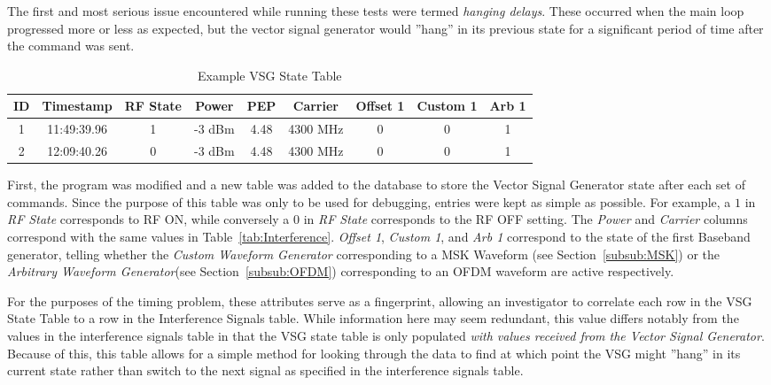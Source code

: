 The first and most serious issue encountered while running these tests were termed \textit{hanging delays}. These occurred when the main loop progressed more or less as expected, but the vector signal generator would ''hang'' in its previous state for a significant period of time after the command was sent. 



\begin{table}[]
\centering
\begin{tabular}{@{}ccccccccc@{}}
\toprule
ID & Timestamp   & RF State & Power  & PEP  & Carrier  & Offset 1 & Custom 1 & Arb 1 \\ \midrule
1  & 11:49:39.96 & 1        & -3 dBm & 4.48 & 4300 MHz & 0        & 0        & 1     \\
2  & 12:09:40.26 & 0        & -3 dBm & 4.48 & 4300 MHz & 0        & 0        & 1     \\ \bottomrule


\end{tabular}
\caption{Example VSG State Table}
\label{tab:VSG_State}
\end{table}
 
	 First, the program was modified and a new table was added to the database to store the Vector Signal Generator state after each set of commands. Since the purpose of this table was only to be used for debugging, entries were kept as simple as possible. For example, a $1$ in \textit{RF State} corresponds to RF ON, while conversely a $0$ in \textit{RF State} corresponds to the RF OFF setting. The \textit{Power} and \textit{Carrier} columns correspond with the same values in Table~\ref{tab:Interference}. \textit{Offset 1}, \textit{Custom 1}, and \textit{Arb 1} correspond to the state of the first Baseband generator, telling whether the \textit{Custom Waveform Generator} corresponding to a MSK Waveform (see Section~\ref{subsub:MSK}) or the \textit{Arbitrary Waveform Generator}(see Section~\ref{subsub:OFDM}) corresponding to an OFDM waveform are active respectively. 
	 
For the purposes of the timing problem, these attributes serve as a fingerprint, allowing an investigator to correlate each row in the VSG State Table to a row in the Interference Signals table. While information here may seem redundant, this value differs notably from the values in the interference signals table in that the VSG state table is only populated \textit{with values received from the Vector Signal Generator}. Because of this, this table allows for a simple method for looking through the data to find at which point the VSG might ''hang'' in its current state rather than switch to the next signal as specified in the interference signals table. 


